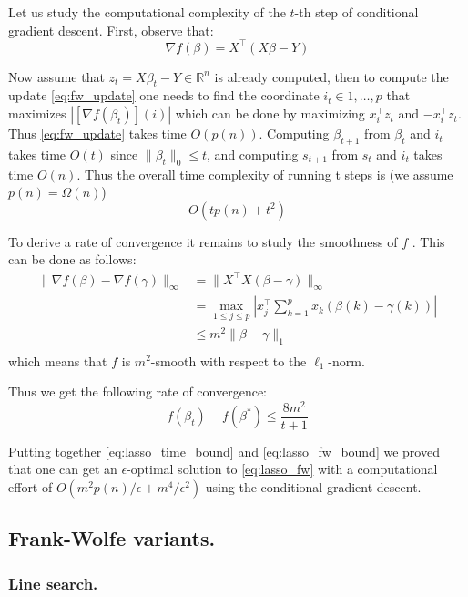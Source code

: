 Let us study the computational complexity of the $t$-th step of
conditional gradient descent. First, observe that:
\begin{equation}
\nabla f (\beta)=X^\top (X\beta-Y) \nonumber
\end{equation}

Now assume that $z_t=X \beta_t - Y \in \mathbb{R}^n$ is already computed, then to compute the update \ref{eq:fw_update} one needs to find  the coordinate $i_t \in 1,\ldots,p$ that maximizes $| [\nabla f(\beta_t)](i) |$ which can be done by maximizing $x_i^\top z_t$ and $-x_i^\top z_t$. Thus \ref{eq:fw_update} takes time $O(p(n))$. Computing $\beta_{t+1}$ from $\beta_t$ and $i_t$ takes time $O(t)$ since $\|\beta_t \|_0 \leq t$, and computing $s_{t+1}$ from $s_t$ and $i_t$ takes time $O(n)$. Thus the overall time complexity of running t steps is (we assume $p(n) =\Omega(n)$)
\begin{equation} \label{eq:lasso_time_bound}
O(tp(n) + t^2 )
\end{equation}

To derive a rate of convergence it remains to study the smoothness
of $f$ . This can be done as follows:
\begin{align}
\| \nabla f(\beta) - \nabla f(\gamma) \|_{\infty} & = \| X^\top X(\beta-\gamma) \|_{\infty} \nonumber \\
& = \max_{1 \leq j \leq p} | x_j^\top \sum_{k=1}^{p} x_k(\beta(k)-\gamma(k)) | \nonumber \\
& \leq m^2 \| \beta-\gamma \|_1 \nonumber \\
\end{align}
which means that $f$ is $m^2$-smooth with respect to the $\ell_1$-norm.

Thus we get the following rate of convergence:
\begin{equation} \label{eq:lasso_fw_bound}
f(\beta_t)-f(\beta^*) \leq \frac{8 m^2}{t+1}
\end{equation}

Putting together \ref{eq:lasso_time_bound} and \ref{eq:lasso_fw_bound} we proved that one can get an $\epsilon$-optimal solution to \ref{eq:lasso_fw} with a computational effort of $O(m^2 p(n)/\epsilon+m^4/\epsilon^2)$ using the conditional gradient descent.

\subsection{Frank-Wolfe variants.}

\subsubsection{Line search.}

